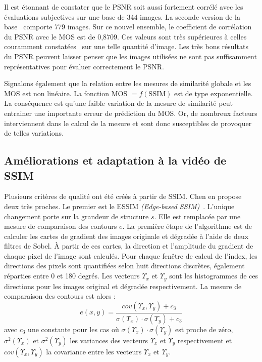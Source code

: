 Il est étonnant de constater que le PSNR soit aussi fortement corrélé avec les évaluations subjectives sur une base de 344 images. La seconde version de la base~\cite{sheikh-ip2006} comporte 779 images. Sur ce nouvel ensemble, le coefficient de corrélation du PSNR avec le MOS est de 0,8709. Ces valeurs sont très supérieures à celles couramment constatées~\cite{oelbaum-pcs2007} sur une telle quantité d'image. Les très bons résultats du PSNR peuvent laisser penser que les images utilisées ne sont pas suffisamment représentatives pour évaluer correctement le PSNR.

Signalons également que la relation entre les mesures de similarité globale et les MOS est non linéaire. La fonction MOS $= f(\text{SSIM})$ est de type exponentielle. %
La conséquence est qu'une faible variation de la mesure de similarité peut entrainer une importante erreur de prédiction du MOS. Or, de nombreux facteurs interviennent dans le calcul de la mesure et sont donc susceptibles de provoquer de telles variations.


\subsection{Améliorations et adaptation à la vidéo de SSIM}
Plusieurs critères de qualité ont été créés à partir de SSIM. Chen en propose deux très proches. Le premier est le ESSIM \emph{(Edge-based SSIM)}~\cite{chen-icassp2006}. L'unique changement porte sur la grandeur de structure $s$. Elle est remplacée par une mesure de comparaison des contours $e$. La première étape de l'algorithme est de calculer les cartes de gradient des images originale et dégradée à l'aide de deux filtres de Sobel. À partir de ces cartes, la direction et l'amplitude du gradient de chaque pixel de l'image sont calculés. Pour chaque fenêtre de calcul de l'index, les directions des pixels sont quantifiées selon huit directions discrètes, également réparties entre 0 et 180 degrés. Les vecteurs $\Upsilon_x$ et $\Upsilon_y$ sont les histogrammes de ces directions pour les images original et dégradée respectivement. La mesure de comparaison des contours est alors :
\begin{equation}
e(x,y) = \frac{\mathit{cov}(\Upsilon_x,\Upsilon_y) + c_3}{\sigma(\Upsilon_x)\cdot\sigma(\Upsilon_y) + c_3}
\end{equation}
%
avec $c_3$ une constante pour les cas où $\sigma(\Upsilon_x)\cdot\sigma(\Upsilon_y)$ est proche de zéro, $\sigma^2(\Upsilon_x)$ et $\sigma^2(\Upsilon_y)$ les variances des vecteurs $\Upsilon_x$ et $\Upsilon_y$ respectivement et $\mathit{cov}(\Upsilon_x, \Upsilon_y)$ la covariance entre les vecteurs $\Upsilon_x$ et $\Upsilon_y$.

